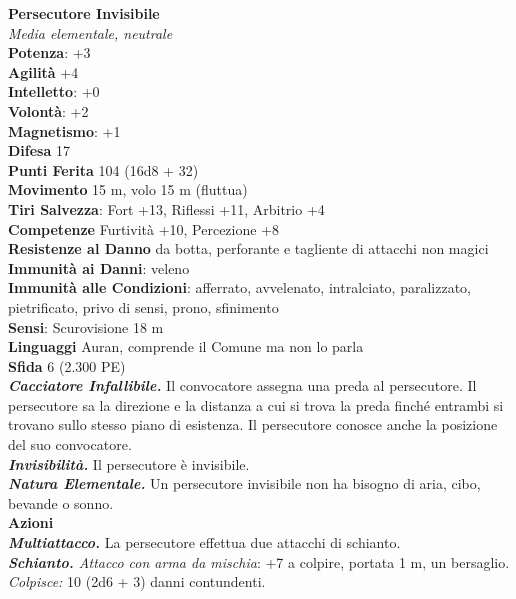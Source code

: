 \begin{multicols}{2}
\medskip\textbf{Persecutore Invisibile}\\
\emph{Media elementale, neutrale}\\
\textbf{Potenza}: +3\\
\textbf{Agilità} +4\\
\textbf{Intelletto}: +0\\
\textbf{Volontà}: +2\\
\textbf{Magnetismo}: +1\\
\textbf{Difesa} 17\\
\textbf{Punti Ferita} 104 (16d8 + 32)\\
\textbf{Movimento} 15 m, volo 15 m (fluttua)\\
\textbf{Tiri Salvezza}: Fort +13, Riflessi +11, Arbitrio +4\\
\textbf{Competenze} Furtività +10, Percezione +8\\
\textbf{Resistenze al Danno} da botta, perforante e tagliente di attacchi non magici\\
\textbf{Immunità ai Danni}: veleno\\
\textbf{Immunità alle Condizioni}: afferrato, avvelenato, intralciato, paralizzato, pietrificato, privo di sensi, prono, sfinimento\\
\textbf{Sensi}: Scurovisione 18 m\\
\textbf{Linguaggi} Auran, comprende il Comune ma non lo parla \\
\textbf{Sfida} 6 (2.300 PE)\smallskip\\
\emph{\textbf{Cacciatore Infallibile.}} Il convocatore assegna una preda al persecutore. Il persecutore sa la direzione e la distanza a cui si trova la preda finché entrambi si trovano sullo stesso piano di esistenza. Il persecutore conosce anche la posizione del suo convocatore.\\
\emph{\textbf{Invisibilità.}} Il persecutore è invisibile.\\
\emph{\textbf{Natura Elementale.}} Un persecutore invisibile non ha bisogno di aria, cibo, bevande o sonno.\\
\smallskip\textbf{Azioni}\\
\emph{\textbf{Multiattacco.}} La persecutore effettua due attacchi di schianto.\\
\emph{\textbf{Schianto.} Attacco con arma da mischia}: +7 a colpire, portata 1 m, un bersaglio.\\
\emph{Colpisce:} 10 (2d6 + 3) danni contundenti.\\


\end{multicols}
